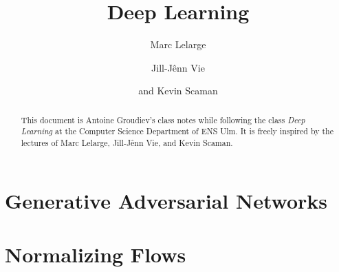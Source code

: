 \documentclass[toc, titlepaged]{../cs-classes/cs-classes}
\title{Deep Learning}
\author{Marc Lelarge\and Jill-Jênn Vie\and and Kevin Scaman}
\begin{document}
\begin{abstract}
    This document is Antoine Groudiev's class notes while following the class \emph{Deep Learning} at the Computer Science Department of ENS Ulm. It is freely inspired by the lectures of Marc Lelarge, Jill-Jênn Vie, and Kevin Scaman.
\end{abstract}





% 








\section{Generative Adversarial Networks}

\section{Normalizing Flows}
\end{document}
